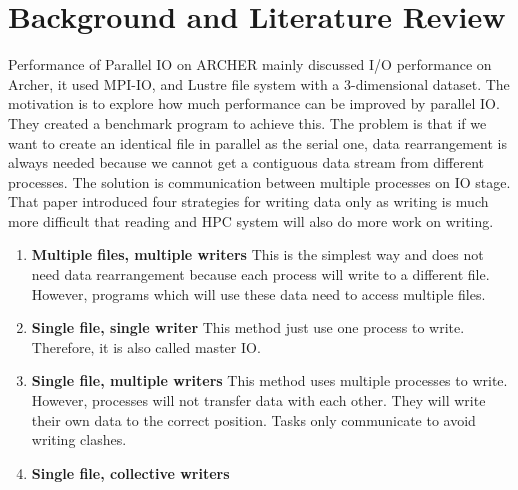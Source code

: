 \documentclass{article}
\begin{document}
\section{Background and Literature Review}


Performance of Parallel IO on ARCHER \cite{ref:lam} mainly discussed I/O performance on Archer, it used MPI-IO, and Lustre file system with a 3-dimensional dataset. The motivation is to explore how much performance can be improved by parallel IO. They created a benchmark program to achieve this.
The problem is that if we want to create an identical file in parallel as the serial one, data rearrangement is always needed because we cannot get a contiguous data stream from different processes.
The solution is communication between multiple processes on IO stage. That paper introduced four strategies for writing data only as writing is much more difficult that reading and HPC system will also do more work on writing.

\begin{enumerate}
	\item \textbf{Multiple files, multiple writers}
	This is the simplest way and does not need data rearrangement because each process will write to a different file. However, programs which will use these data need to access multiple files.
	\item \textbf{Single file, single writer}
	This method just use one process to write. Therefore, it is also called master IO.
	\item \textbf{Single file, multiple writers}
	This method uses multiple processes to write. However, processes will not transfer data with each other. They will write their own data to the correct position. Tasks only communicate to avoid writing clashes.
	\item \textbf{Single file, collective writers}
	
\end{enumerate}
\end{document}
